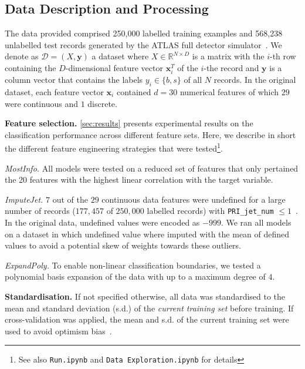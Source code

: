 \documentclass[10pt,conference,compsocconf]{IEEEtran}
\newcommand{\parabf}[1]{\vspace{1mm}\noindent\textbf{#1}}
\newcommand{\parait}[1]{\vspace{1mm}\noindent\textit{#1}}
\newcommand{\Data}{\mathcal{D}}
\newcommand{\features}{\mathbf{x}_i}
\newcommand{\target}{y_i}
\newcommand{\targetset}{\{ b, s \}}
\newcommand{\targetvector}{\mathbf{y}}
\begin{document}
\subsection{Data Description and Processing}
\label{sec:data}
The data provided comprised 250,000 labelled training examples and 568,238 unlabelled test records generated by the ATLAS full detector simulator~\cite{HiggsML}.
We denote as $\Data = (X, \targetvector)$ a dataset where $X \in \mathbb{R}^{N \times D}$ is a matrix with the $i$-th row containing the $D$-dimensional feature vector $\features^T$ of the $i$-the record and $\targetvector$ is a column vector that contains the labels $\target \in \targetset$ of all $N$ records.       
In the original dataset, each feature vector $\features$ contained $d=30$ numerical features of which $29$ were continuous and $1$ discrete.  

\parabf{Feature selection.} \autoref{sec:results} presents experimental results on the classification performance across different feature sets. Here, we describe in short the different feature engineering strategies that were tested\footnote{See also \texttt{Run.ipynb} and \texttt{Data Exploration.ipynb} for details}.

\parait{MostInfo.} All models were tested on a reduced set of features that only pertained the 20 features with the highest linear correlation with the target variable.

\parait{ImputeJet.} $7$ out of the $29$ continuous data features were undefined for a large number of records ($177,457$ of $250,000$ labelled records) with \texttt{PRI\_jet\_num} $\leq 1$~\cite{OpenDataCERN}. In the original data, undefined values were encoded as $-999$. We ran all models on a dataset in which undefined value where imputed with the mean of defined values to avoid a potential skew of weights towards these outliers.

\parait{ExpandPoly.} To enable non-linear classification boundaries, we tested a polynomial basis expansion of the data with up to a maximum degree of $4$.

\parabf{Standardisation.} If not specified otherwise, all data was standardised to the mean and standard deviation (s.d.) of the \emph{current training set} before training. If cross-validation was applied, the mean and s.d. of the current training set were used to avoid optimism bias~\cite{Domingos2012}. 

\vspace*{-2mm}
\end{document}
